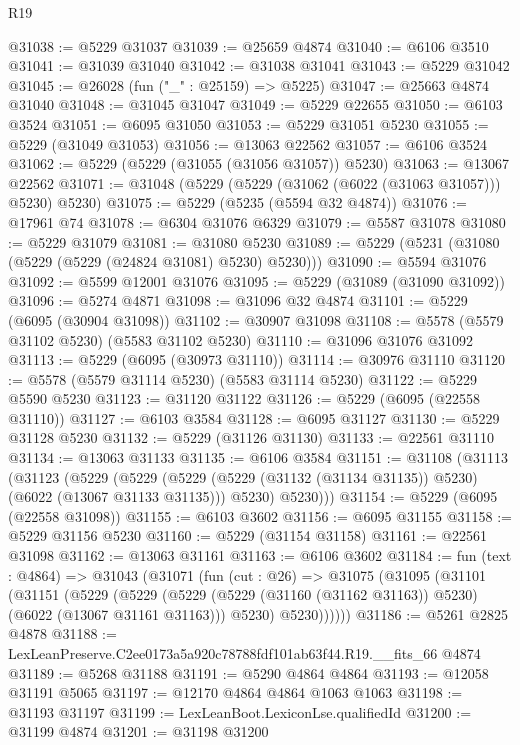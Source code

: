 \begin{lexlean}{R19}
\begin{coremodule}
@31038 := @5229 @31037
@31039 := @25659 @4874
@31040 := @6106 @3510
@31041 := @31039 @31040
@31042 := @31038 @31041
@31043 := @5229 @31042
@31045 := @26028 (fun ("_" : @25159) => @5225)
@31047 := @25663 @4874 @31040
@31048 := @31045 @31047
@31049 := @5229 @22655
@31050 := @6103 @3524
@31051 := @6095 @31050
@31053 := @5229 @31051 @5230
@31055 := @5229 (@31049 @31053)
@31056 := @13063 @22562
@31057 := @6106 @3524
@31062 := @5229 (@5229 (@31055 (@31056 @31057)) @5230)
@31063 := @13067 @22562
@31071 := @31048 (@5229 (@5229 (@31062 (@6022 (@31063 @31057))) @5230) @5230)
@31075 := @5229 (@5235 (@5594 @32 @4874))
@31076 := @17961 @74
@31078 := @6304 @31076 @6329
@31079 := @5587 @31078
@31080 := @5229 @31079
@31081 := @31080 @5230
@31089 := @5229 (@5231 (@31080 (@5229 (@5229 (@24824 @31081) @5230) @5230)))
@31090 := @5594 @31076
@31092 := @5599 @12001 @31076
@31095 := @5229 (@31089 (@31090 @31092))
@31096 := @5274 @4871
@31098 := @31096 @32 @4874
@31101 := @5229 (@6095 (@30904 @31098))
@31102 := @30907 @31098
@31108 := @5578 (@5579 @31102 @5230) (@5583 @31102 @5230)
@31110 := @31096 @31076 @31092
@31113 := @5229 (@6095 (@30973 @31110))
@31114 := @30976 @31110
@31120 := @5578 (@5579 @31114 @5230) (@5583 @31114 @5230)
@31122 := @5229 @5590 @5230
@31123 := @31120 @31122
@31126 := @5229 (@6095 (@22558 @31110))
@31127 := @6103 @3584
@31128 := @6095 @31127
@31130 := @5229 @31128 @5230
@31132 := @5229 (@31126 @31130)
@31133 := @22561 @31110
@31134 := @13063 @31133
@31135 := @6106 @3584
@31151 := @31108
    (@31113
      (@31123
        (@5229
          (@5229
            (@5229 (@5229 (@31132 (@31134 @31135)) @5230) (@6022 (@13067 @31133 @31135)))
            @5230)
          @5230)))
@31154 := @5229 (@6095 (@22558 @31098))
@31155 := @6103 @3602
@31156 := @6095 @31155
@31158 := @5229 @31156 @5230
@31160 := @5229 (@31154 @31158)
@31161 := @22561 @31098
@31162 := @13063 @31161
@31163 := @6106 @3602
@31184 := fun (text : @4864) =>
  @31043
    (@31071
      (fun (cut : @26) =>
      @31075
        (@31095
          (@31101
            (@31151
              (@5229
                (@5229
                  (@5229 (@5229 (@31160 (@31162 @31163)) @5230) (@6022 (@13067 @31161 @31163)))
                  @5230)
                @5230))))))
@31186 := @5261 @2825 @4878
@31188 := LexLeanPreserve.C2ee0173a5a920c78788fdf101ab63f44.R19.__fits_66 @4874
@31189 := @5268 @31188
@31191 := @5290 @4864 @4864
@31193 := @12058 @31191 @5065
@31197 := @12170 @4864 @4864 @1063 @1063
@31198 := @31193 @31197
@31199 := LexLeanBoot.LexiconLse.qualifiedId
@31200 := @31199 @4874
@31201 := @31198 @31200

\end{coremodule}
\end{lexlean}
